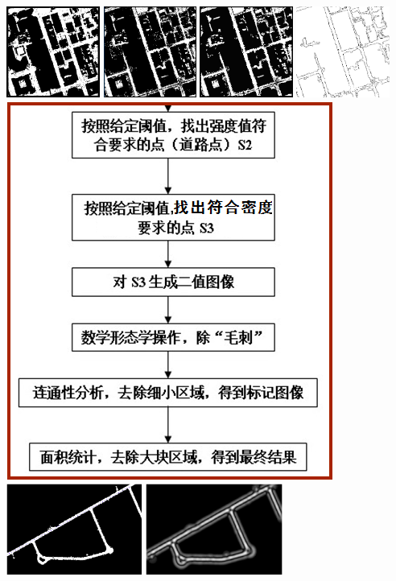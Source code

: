 \includegraphics[height=3cm]{figure/Chapter6/高程约束提取道路点}
\includegraphics[height=3cm]{figure/Chapter6/强度约束提取道路点}
\includegraphics[height=3cm]{figure/Chapter6/条带优化处理}
\includegraphics[height=3cm]{figure/Chapter6/道路轮廓线自适应提取}
\includegraphics[width=0.3\linewidth]{figure/Chapter6/相位编码圆盘步骤2}
\includegraphics[height=3cm]{figure/Chapter6/路段灰度图}
\includegraphics[height=3cm]{figure/Chapter6/路段幅度图}
